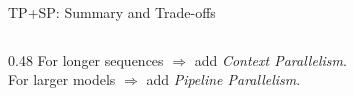 \begin{frame}{TP+SP: Summary and Trade-offs}
\begin{columns}
\begin{column}{0.48\textwidth}
      \vspace{0.3em}
      {\small For longer sequences $\Rightarrow$ add \emph{Context Parallelism}. \\
       For larger models $\Rightarrow$ add \emph{Pipeline Parallelism}.}
    \end{column}
  \end{columns}
\end{frame}
